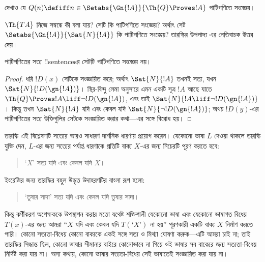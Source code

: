 \documentclass[../../../include/open-logic-section]{subfiles}
\begin{document}
\begin{prob}
দেখাও যে $Q(n) \defiff n \in \Setabs{\Gn{!A}}{\Th{Q} \Proves !A}$
পাটিগণিতে সংজ্ঞেয়।
\end{prob}

$\Th{TA}$ নিজে সম্বন্ধে কী বলা যায়? সেটি কি পাটিগণিতে সংজ্ঞেয়? অর্থাৎ
সেট $\Setabs{\Gn{!A}}{\Sat{N}{!A}}$ কি পাটিগণিতে সংজ্ঞেয়? তারস্কির
উপপাদ্য এর নেতিবাচক উত্তর দেয়।

\begin{thm}
পাটিগণিতের সত্য !!{sentence}sর সেটটি পাটিগণিতে সংজ্ঞেয় নয়।
\end{thm}

\begin{proof}
ধরি $!D(x)$ সেটিকে সংজ্ঞায়িত করে; অর্থাৎ $\Sat{N}{!A}$ তখনই সত্য, যখন
$\Sat{N}{!D(\gn{!A})}$। স্থির-বিন্দু লেমা অনুসারে এমন একটি সূত্র $!A$
আছে যাতে $\Th{Q} \Proves !A \liff \lnot !D(\gn{!A})$, এবং তাই
$\Sat{N}{!A \liff \lnot !D(\gn{!A})}$। কিন্তু তখন $\Sat{N}{!A}$ যদি
এবং কেবল যদি $\Sat{N}{\lnot !D(\gn{!A})}$; অথচ $!D(y)$-এর পাটিগণিতের
সত্য উক্তিগুলির সেটকে সংজ্ঞায়িত করার কথা—এর সঙ্গে বিরোধ হয়।
\end{proof}

তারস্কি এই বিশ্লেষণটি সত্যের আরও সাধারণ দার্শনিক ধারণায় প্রয়োগ করেন।
যেকোনো ভাষা $L$ দেওয়া থাকলে তারস্কি যুক্তি দেন, $L$-এর জন্য সত্যের
পর্যাপ্ত ধারণাকে প্রতিটি বাক্য $X$-এর জন্য নিচেরটি পূরণ করতে হবে:
\begin{quote}
`$X$' সত্য যদি এবং কেবল যদি $X$।
\end{quote}
ইংরেজির জন্য তারস্কির বহুল উদ্ধৃত উদাহরণটির বাংলা রূপ হলো:
\begin{quote}
`তুষার সাদা' সত্য যদি এবং কেবল যদি তুষার সাদা।
\end{quote}
কিন্তু কর্ণীকরণ অপেক্ষককে উপস্থাপন করার মতো যথেষ্ট শক্তিশালী যেকোনো ভাষা এবং
যেকোনো ভাষাগত বিধেয় $T(x)$-এর জন্য আমরা ``$X$ যদি এবং কেবল যদি
$T(\text{`$X$'})$ না হয়'' পূরণকারী একটি বাক্য $X$ নির্মাণ করতে পারি।
কোনো সত্যতা-বিধেয় কোনো বাক্যকে একই সঙ্গে সত্য ও মিথ্যা ঘোষণা করুক—এটি
আমরা চাই না; তাই তারস্কির সিদ্ধান্ত ছিল, কোনো ভাষার সীমানার বাইরে কোনোভাবে
না গিয়ে ওই ভাষার সব বাক্যের জন্য সত্যতা-বিধেয় নির্দিষ্ট করা যায় না।
অন্য কথায়, কোনো ভাষার সত্যতা-বিধেয় সেই ভাষাতেই সংজ্ঞায়িত করা যায় না।
\end{document}
